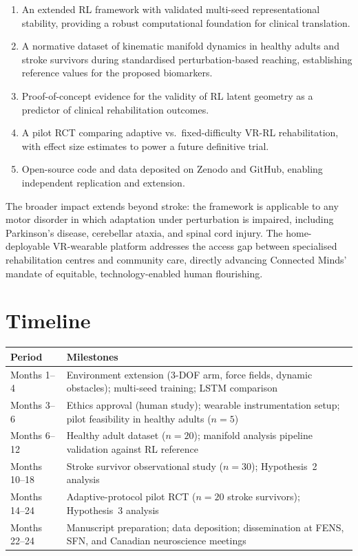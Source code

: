 \documentclass[12pt]{article}
\begin{document}
\begin{enumerate}[leftmargin=*, label=\arabic*.]
  \item An extended RL framework with validated multi-seed representational
        stability, providing a robust computational foundation for clinical
        translation.
  \item A normative dataset of kinematic manifold dynamics in healthy adults
        and stroke survivors during standardised perturbation-based reaching,
        establishing reference values for the proposed biomarkers.
  \item Proof-of-concept evidence for the validity of RL latent geometry as
        a predictor of clinical rehabilitation outcomes.
  \item A pilot RCT comparing adaptive vs.\ fixed-difficulty VR-RL
        rehabilitation, with effect size estimates to power a future
        definitive trial.
  \item Open-source code and data deposited on Zenodo and GitHub, enabling
        independent replication and extension.
\end{enumerate}

The broader impact extends beyond stroke: the framework is applicable to
any motor disorder in which adaptation under perturbation is impaired,
including Parkinson's disease, cerebellar ataxia, and spinal cord injury.
The home-deployable VR-wearable platform addresses the access gap between
specialised rehabilitation centres and community care, directly advancing
Connected Minds' mandate of equitable, technology-enabled human
flourishing.

\section{Timeline}

\begin{tabularx}{\linewidth}{@{}lX@{}}
\toprule
\textbf{Period} & \textbf{Milestones} \\
\midrule
Months 1--4   & Environment extension (3-DOF arm, force fields, dynamic obstacles); multi-seed training; LSTM comparison \\
Months 3--6   & Ethics approval (human study); wearable instrumentation setup; pilot feasibility in healthy adults ($n=5$) \\
Months 6--12  & Healthy adult dataset ($n=20$); manifold analysis pipeline validation against RL reference \\
Months 10--18 & Stroke survivor observational study ($n=30$); Hypothesis~2 analysis \\
Months 14--24 & Adaptive-protocol pilot RCT ($n=20$ stroke survivors); Hypothesis~3 analysis \\
Months 22--24 & Manuscript preparation; data deposition; dissemination at FENS, SFN, and Canadian neuroscience meetings \\
\bottomrule
\end{tabularx}
\end{document}

